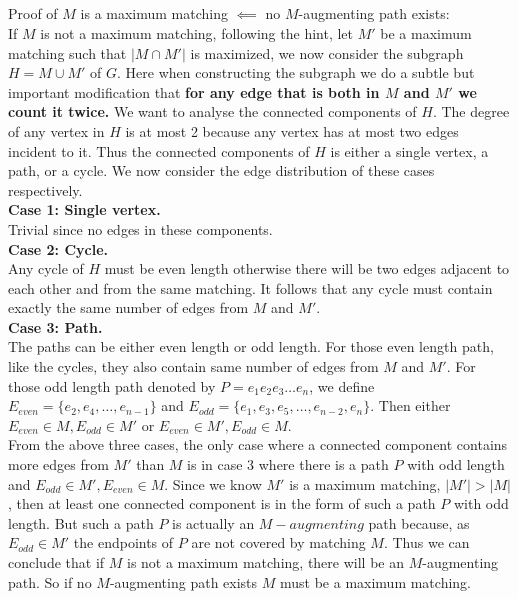 \documentclass[12pt,letterpaper]{article}
\begin{document}
\subsection{}
Proof of $M$ is a maximum matching $\impliedby$ no $M$-augmenting path exists:\\
If $M$ is not a maximum matching, following the hint,
let $M'$ be a maximum matching such that $|M\cap M'|$ is maximized,
we now consider the subgraph $H=M\cup M'$ of $G$.
Here when constructing the subgraph we do a subtle but important modification that 
\textbf{for any edge that is both in $M$ and $M'$ we count it twice.}
We want to analyse the connected components of $H$.
The degree of any vertex in $H$ is at most 2 
because any vertex has at most two edges incident to it.
Thus the connected components of $H$ is either a single vertex,
a path, or a cycle.
We now consider the edge distribution of these cases respectively.\\
\textbf{Case 1: Single vertex.}\\
Trivial since no edges in these components.\\
\textbf{Case 2: Cycle.}\\
Any cycle of $H$ must be even length otherwise there will be 
two edges adjacent to each other and from the same matching.
It follows that any cycle must contain exactly the same number of edges from $M$ and $M'$.\\
\textbf{Case 3: Path.}\\
The paths can be either even length or odd length.
For those even length path, like the cycles,
they also contain same number of edges from $M$ and $M'$.
For those odd length path denoted by $P=e_1e_2e_3\dots e_n$,
we define $E_{even}=\{e_2,e_4,\dots,e_{n-1}\}$
and $E_{odd}=\{e_1,e_3,e_5,\dots,e_{n-2},e_{n}\}$. 
Then either $E_{even}\in M, E_{odd}\in M'$ or $E_{even}\in M', E_{odd}\in M$.\\
\newline
From the above three cases, the only case where a connected component
contains more edges from $M'$ than $M$ is in case 3 where 
there is a path $P$ with odd length and $E_{odd}\in M', E_{even}\in M$.
Since we know $M'$ is a maximum matching, $|M'|>|M|$,
then at least one connected component is in the form of such a path $P$ with 
odd length.
But such a path $P$ is actually an $M-augmenting$ path because,
as $E_{odd}\in M'$ the endpoints of $P$ are not covered by matching $M$.
Thus we can conclude that if $M$ is not a maximum matching, 
there will be an $M$-augmenting path.
So if no $M$-augmenting path exists $M$ must be a maximum matching.

\section{}
\end{document}
